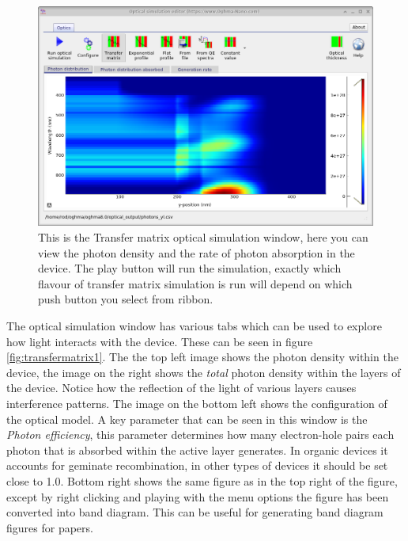 \begin{figure}[H]
\centering
\includegraphics[width=1.0\textwidth,height=0.6\textwidth]{./images/transfer_matrix/opticalsimulation4.png}
\caption{This is the Transfer matrix optical simulation window, here you can view the photon density and the rate of photon absorption in the device.  The play button will run the simulation, exactly which flavour of transfer matrix simulation is run will depend on which push button you select from ribbon.}
\label{fig:transfermatrix0}
\end{figure}

The optical simulation window has various tabs which can be used to explore how light interacts with the device. These can be seen in figure \ref{fig:transfermatrix1}. The the top left image shows the photon density within the device, the image on the right shows the \emph{total} photon density within the layers of the device.  Notice how the reflection of the light of various layers causes interference patterns.  The image on the bottom left shows the configuration of the optical model. A key parameter that can be seen in this window is the \emph{Photon efficiency}, this parameter determines how many electron-hole pairs each photon that is absorbed within the active layer generates. In organic devices it accounts for geminate recombination, in other types of devices it should be set close to 1.0. Bottom right shows the same figure as in the top right of the figure, except by right clicking and playing with the menu options the figure has been converted into band diagram.  This can be useful for generating band diagram figures for papers.
  
